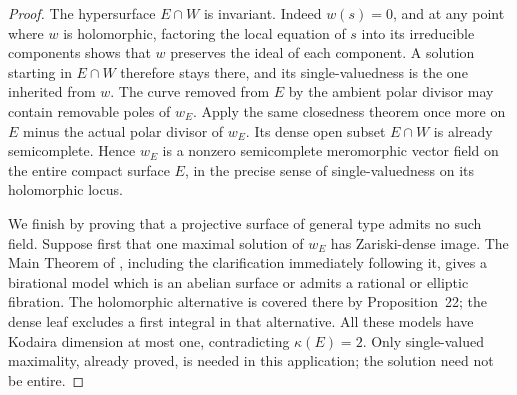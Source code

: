 \begin{proof}
The hypersurface $E\cap W$ is invariant.
Indeed $w(s)=0$, and at any point where
$w$ is holomorphic, factoring the local
equation of $s$ into its irreducible
components shows that $w$ preserves the
ideal of each component. A solution
starting in $E\cap W$ therefore stays
there, and its single-valuedness is the
one inherited from $w$. The curve removed
from $E$ by the ambient polar divisor may
contain removable poles of $w_E$. Apply
the same closedness theorem once more on
$E$ minus the actual polar divisor of
$w_E$. Its dense open subset $E\cap W$
is already semicomplete. Hence $w_E$ is
a nonzero semicomplete meromorphic vector
field on the entire compact surface $E$,
in the precise sense of single-valuedness
on its holomorphic locus.

We finish by proving that a projective
surface of general type admits no such
field. Suppose first that one maximal
solution of $w_E$ has Zariski-dense image.
The Main Theorem of \cite{Guillot2019},
including the clarification immediately
following it, gives a birational model
which is an abelian surface or admits a
rational or elliptic fibration. The
holomorphic alternative is covered there
by Proposition~22; the dense leaf excludes
a first integral in that alternative.
All these models have Kodaira dimension
at most one, contradicting $\kappa(E)=2$.
Only single-valued maximality, already
proved, is needed in this application;
the solution need not be entire.


\end{proof}
